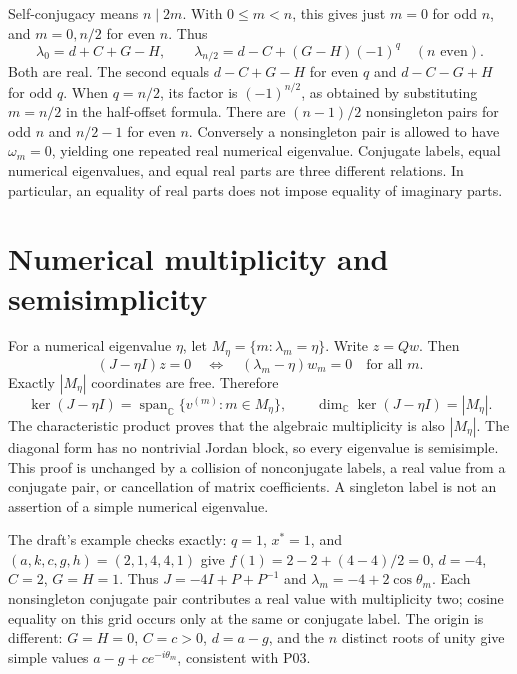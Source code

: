 \documentclass[11pt]{article}
\newcommand{\CC}{\mathbb C}
\begin{document}
Self-conjugacy means $n\mid2m$. With $0\le m<n$, this gives just $m=0$
for odd $n$, and $m=0,n/2$ for even $n$. Thus
\[
 \lambda_0=d+C+G-H,\qquad
 \lambda_{n/2}=d-C+(G-H)(-1)^q\quad(n\text{ even}).
\]
Both are real. The second equals $d-C+G-H$ for even $q$ and
$d-C-G+H$ for odd $q$. When $q=n/2$, its factor is $(-1)^{n/2}$,
as obtained by substituting $m=n/2$ in the half-offset formula.
There are $(n-1)/2$ nonsingleton pairs for odd $n$ and $n/2-1$ for even $n$.
Conversely a nonsingleton pair is allowed to have $\omega_m=0$, yielding
one repeated real numerical eigenvalue. Conjugate labels, equal numerical
eigenvalues, and equal real parts are three different relations. In particular,
an equality of real parts does not impose equality of imaginary parts.

\section{Numerical multiplicity and semisimplicity}
For a numerical eigenvalue $\eta$, let
$M_\eta=\{m:\lambda_m=\eta\}$. Write $z=Qw$. Then
\[
 (J-\eta I)z=0\quad\Longleftrightarrow\quad
 (\lambda_m-\eta)w_m=0\quad\text{for all }m.
\]
Exactly $|M_\eta|$ coordinates are free. Therefore
\[
 \ker(J-\eta I)=\operatorname{span}_{\CC}\{v^{(m)}:m\in M_\eta\},
 \qquad \dim_{\CC}\ker(J-\eta I)=|M_\eta|.
\]
The characteristic product proves that the algebraic multiplicity is also
$|M_\eta|$. The diagonal form has no nontrivial Jordan block, so every
eigenvalue is semisimple. This proof is unchanged by a collision of
nonconjugate labels, a real value from a conjugate pair, or cancellation of
matrix coefficients. A singleton label is not an assertion of a simple
numerical eigenvalue.

The draft's example checks exactly: $q=1$, $x^*=1$, and
$(a,k,c,g,h)=(2,1,4,4,1)$ give $f(1)=2-2+(4-4)/2=0$,
$d=-4$, $C=2$, $G=H=1$. Thus $J=-4I+P+P^{-1}$ and
$\lambda_m=-4+2\cos\theta_m$. Each nonsingleton conjugate pair contributes
a real value with multiplicity two; cosine equality on this grid occurs
only at the same or conjugate label. The origin is different: $G=H=0$,
$C=c>0$, $d=a-g$, and the $n$ distinct roots of unity give simple values
$a-g+ce^{-i\theta_m}$, consistent with P03.
\end{document}
